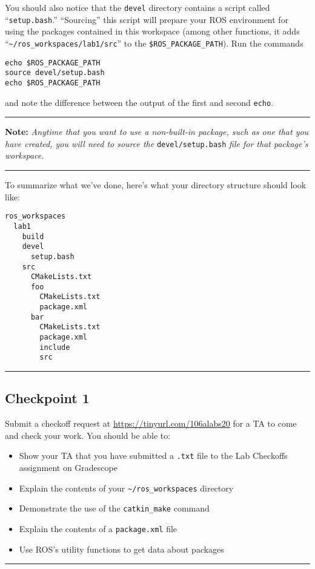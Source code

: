 \documentclass{article}
\begin{document}
You should also notice that the \verb=devel= directory contains a script called ``\verb=setup.bash=.'' ``Sourcing'' this script will prepare your ROS environment for using the packages contained in this workspace (among other functions, it adds ``\verb=~/ros_workspaces/lab1/src='' to the \verb=$ROS_PACKAGE_PATH=). Run the commands
\begin{Verbatim}[frame=single]
echo $ROS_PACKAGE_PATH
source devel/setup.bash
echo $ROS_PACKAGE_PATH
\end{Verbatim}
and note the difference between the output of the first and second \verb=echo=.

\noindent\rule{\columnwidth}{0.5pt}

\textbf{Note: }\emph{Anytime that you want to use a non-built-in package, such as one that you have created, you will need to source the} \verb=devel/setup.bash= \emph{file for that package's workspace.}

\noindent\rule{\columnwidth}{0.5pt}

\begin{samepage}
To summarize what we've done, here's what your directory structure should look like:

\begin{Verbatim}[frame=single, samepage=true]
ros_workspaces
  lab1
    build
    devel
      setup.bash
    src
      CMakeLists.txt
      foo
        CMakeLists.txt
        package.xml
      bar
        CMakeLists.txt
        package.xml
        include
        src
\end{Verbatim}
\end{samepage}


\vspace{0.25in}
\begin{samepage}
\noindent\rule{\columnwidth}{0.5pt}

\subsection*{Checkpoint 1}

Submit a checkoff request at \url{https://tinyurl.com/106alabs20} for a TA to come and check your work. You should be able to:


\begin{itemize}
\item Show your TA that you have submitted a \verb=.txt= file to the Lab Checkoffs assignment on Gradescope
\item Explain the contents of your \verb=~/ros_workspaces= directory

\item Demonstrate the use of the \verb=catkin_make= command
\item Explain the contents of a \verb=package.xml= file
\item Use ROS's utility functions to get data about packages
\end{itemize}

\noindent\rule{\columnwidth}{0.5pt}
\end{samepage}
\vspace{0.25in}
\end{document}
